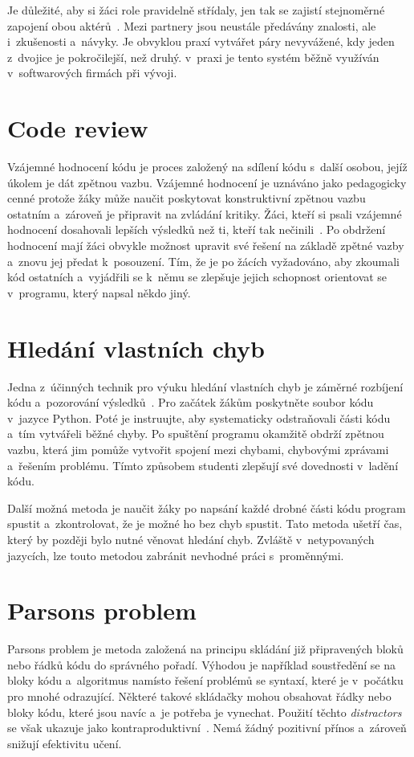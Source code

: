 \documentclass[
  digital,     %
  oneside,     %
  nosansbold,  %
  colorbold, %
  lof,         %
  nolot,         %
]{fithesis4}
\begin{document}
Je důležité, aby si žáci role pravidelně střídaly, jen tak se zajistí stejnoměrné zapojení obou aktérů~\cite{Hanks11}. Mezi partnery jsou neustále předávány znalosti, ale i~zkušenosti a~návyky. Je obvyklou praxí vytvářet páry nevyvážené, kdy jeden z~dvojice je pokročilejší, než druhý. v~praxi je tento systém běžně využíván v~softwarových firmách při vývoji.

\section{Code review}
Vzájemné hodnocení kódu je proces založený na sdílení kódu s~další osobou, jejíž úkolem je dát zpětnou vazbu. Vzájemné hodnocení je uznáváno jako pedagogicky cenné protože žáky může naučit poskytovat konstruktivní zpětnou vazbu ostatním a~zároveň je připravit na zvládání kritiky. Žáci, kteří si psali vzájemné hodnocení dosahovali lepších výsledků než ti, kteří tak nečinili~\cite{Hundhausen13}. Po obdržení hodnocení mají žáci obvykle možnost upravit své řešení na základě zpětné vazby a~znovu jej předat k~posouzení. Tím, že je po žácích vyžadováno, aby zkoumali kód ostatních a~vyjádřili se k~němu se zlepšuje jejich schopnost orientovat se v~programu, který napsal někdo jiný. 

\section{Hledání vlastních chyb}
Jedna z~účinných technik pro výuku hledání vlastních chyb je záměrné rozbíjení kódu a~pozorování výsledků~\cite{Love22}. Pro začátek žákům poskytněte soubor kódu v~jazyce Python. Poté je instruujte, aby systematicky odstraňovali části kódu a~tím vytvářeli běžné chyby. Po spuštění programu okamžitě obdrží zpětnou vazbu, která jim pomůže vytvořit spojení mezi chybami, chybovými zprávami a~řešením problému. Tímto způsobem studenti zlepšují své dovednosti v~ladění kódu.

Další možná metoda je naučit žáky po napsání každé drobné části kódu program spustit a~zkontrolovat, že je možné ho bez chyb spustit. Tato metoda ušetří čas, který by později bylo nutné věnovat hledání chyb. Zvláště v~netypovaných jazycích, lze touto metodou zabránit nevhodné práci s~proměnnými.

\section{Parsons problem}
Parsons problem je metoda založená na principu skládání již připravených bloků nebo řádků kódu do správného pořadí. Výhodou je například soustředění se na bloky kódu a~algoritmus namísto řešení problémů se syntaxí, které je v~počátku pro mnohé odrazující. Některé takové skládačky mohou obsahovat řádky nebo bloky kódu, které jsou navíc a~je potřeba je vynechat. Použití těchto \textit{distractors} se však ukazuje jako kontraproduktivní~\cite{Harms16}. Nemá žádný pozitivní přínos a~zároveň snižují efektivitu učení.
\end{document}
